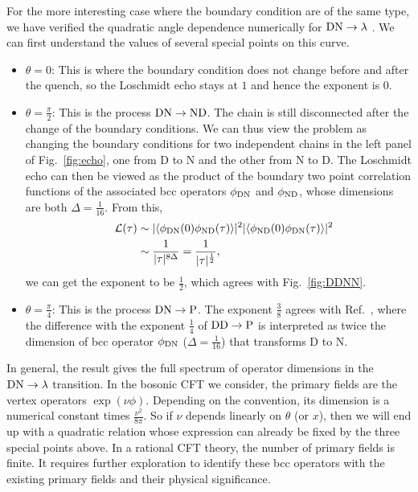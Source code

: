 For the more interesting case where the boundary condition are of the same type, we have verified the quadratic angle dependence numerically for ${\rm DN} \rightarrow \lambda$ {\iffalse \color{red}the process in Eq.~\eqref{eq:DNDN}.\fi}. We can first understand the values of several special points on this curve. 
\begin{itemize}
\item $\theta = 0$: This is where the boundary condition does not change before and after the quench, so the Loschmidt echo stays at $1$ and hence the exponent is $0$.
\item $\theta = \frac{\pi}{2}$: This is the process ${\rm DN}\rightarrow {\rm  ND}$. The chain is still disconnected after the change of the boundary conditions. We can thus view the problem as changing the boundary conditions for two independent chains in the left panel of Fig.~\ref{fig:echo}, one from D to N and the other from N to D. The Loschmidt echo can then be viewed as the product of the boundary two point correlation functions of the associated bcc operators $\phi_{\rm DN}$ and $\phi_{\rm ND}$, whose dimensions are both $\Delta = \frac{1}{16}$. From this,
\begin{equation}
\begin{aligned}
  \quad \mathcal{L}(\tau) &\sim |\langle \phi_{{\rm D N}}(0) \phi_{{\rm ND}}(\tau)   \rangle |^2 
|\langle \phi_{{\rm ND}}(0)  \phi_{{\rm DN}}(\tau)   \rangle| ^2\\
& \sim \frac{1}{|\tau|^{8\Delta}} = \frac{1}{|\tau|^{\frac{1}{2}}},
\end{aligned}
\end{equation}
we can get the exponent to be $\frac{1}{2}$, which agrees with Fig.~\ref{fig:DDNN}. 
\item $\theta = \frac{\pi}{4}$: This is the process ${\rm DN}\rightarrow {\rm P}$. The exponent $\frac{3}{8}$ agrees with Ref.~, where the difference with the exponent $\frac{1}{4}$ of ${\rm DD} \rightarrow {\rm P}$ is interpreted as twice the dimension of bcc operator $\phi_{\rm DN}$ ($\Delta = \frac{1}{16}$) that transforms D to N.
\end{itemize}
In general, the result gives the full spectrum of operator dimensions in the ${\rm DN} \rightarrow \lambda $ transition. In the bosonic CFT we consider, the primary fields are the vertex operators $\exp( \nu \phi )$. Depending on the convention, its dimension is a numerical constant times $\frac{\nu^2}{8\pi}$. So if $\nu$ depends linearly on $\theta$ (or $x$), then we will end up with a quadratic relation whose expression can already be fixed by the three special points above. In a rational CFT theory, the number of primary fields is finite. It requires further exploration to identify these bcc operators with the existing primary fields and their physical significance. 

